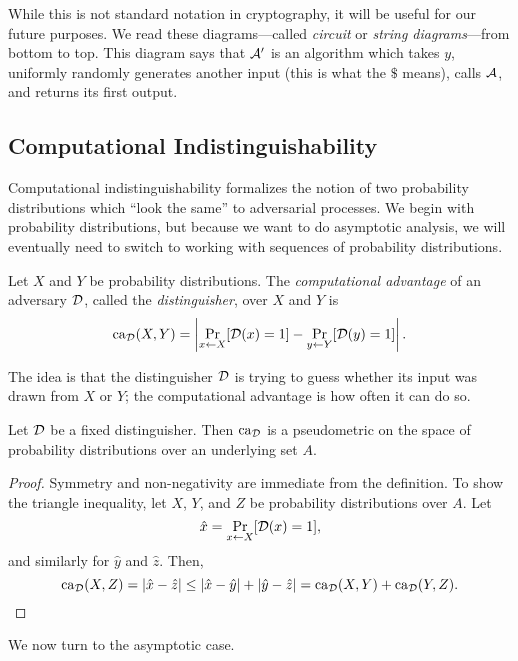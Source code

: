 While this is not standard notation in cryptography, it will be useful for our future purposes.
We read these diagrams---called \emph{circuit} or \emph{string diagrams}---from
bottom to top. This diagram says that $\mathcal{A}'$ is an algorithm which takes $y$,
uniformly randomly generates another input (this is what the $\$$ means), calls
$\mathcal{A}$, and returns its first output.

\subsection{Computational Indistinguishability}

Computational indistinguishability formalizes the notion of two probability
distributions which ``look the same'' to adversarial processes. We begin with
probability distributions, but because we want to do asymptotic analysis, we
will eventually need to switch to working with sequences of probability
distributions.

\begin{dfn}\label{def:computational advantage}
  Let $X$ and $Y$ be probability distributions. The \emph{computational
  advantage} of an adversary $\mathcal{D}$, called the
  \emph{distinguisher}, over $X$ and $Y$ is \[
    \operatorname{ca}_{\mathcal{D}}(X, Y) = \left|\Pr_{x\leftarrow X}[\mathcal{D}(x) = 1] - \Pr_{y\leftarrow Y}[\mathcal{D}(y) = 1]\right|.
  \]
\end{dfn}

The idea is that the distinguisher $\mathcal{D}$ is trying to guess whether its input
was drawn from $X$ or $Y$; the computational advantage is how often it can do
so.

\begin{prop}\label{thm:advantage is metric}
  Let $\mathcal{D}$ be a fixed distinguisher. Then $\operatorname{ca}_{\mathcal{D}}$ is a pseudometric on the
  space of probability distributions over an underlying set $A$.
\end{prop}

\begin{proof}
  Symmetry and non-negativity are immediate from the definition. To show the
  triangle inequality, let $X$, $Y$, and $Z$ be probability distributions over
  $A$. Let \[
    \hat{x} = \Pr_{x\leftarrow X}[\mathcal{D}(x) = 1],
    \] and similarly for $\hat{y}$ and $\hat{z}$. Then, \[
  \operatorname{ca}_{\mathcal{D}}(X, Z) = \left|\hat{x} - \hat{z}\right| \leq \left|\hat{x} -
  \hat{y}\right| + \left|\hat{y} - \hat{z}\right| = \operatorname{ca}_{\mathcal{D}}(X, Y) +
  \operatorname{ca}_{\mathcal{D}}(Y, Z).\qedhere
\]
\end{proof}

We now turn to the asymptotic case.

